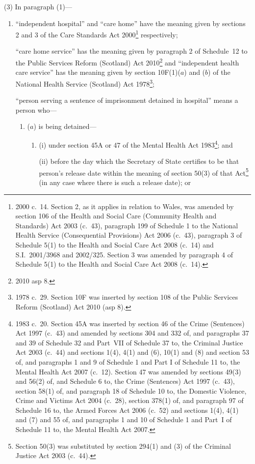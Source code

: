 \documentclass[12pt,a4paper]{article}
\begin{document}
(3) In paragraph (1)—
\begin{enumerate}\item[]
“independent hospital” and “care home” have the meaning given by sections 2 and 3 of the Care Standards Act 2000\footnote{2000 c.~14. Section 2, as it applies in relation to Wales, was amended by section 106 of the Health and Social Care (Community Health and Standards) Act 2003 (c.~43), paragraph 199 of Schedule 1 to the National Health Service (Consequential Provisions) Act 2006 (c.~43), paragraph 3 of Schedule 5(1) to the Health and Social Care Act 2008 (c.~14) and S.I.~2001/3968 and 2002/325. Section 3 was amended by paragraph 4 of Schedule 5(1) to the Health and Social Care Act 2008 (c.~14).} respectively;

“care home service” has the meaning given by paragraph 2 of Schedule~12 to the Public Services Reform (Scotland) Act 2010\footnote{2010 asp 8.} and “independent health care service” has the meaning given by section 10F(1)($a$)  and ($b$)  of the National Health Service (Scotland) Act 1978\footnote{1978 c.~29. Section 10F was inserted by section 108 of the Public Services Reform (Scotland) Act 2010 (asp 8).};

“person serving a sentence of imprisonment detained in hospital” means a person who—
\begin{enumerate}\item[]
($a$) 
is being detained—
\begin{enumerate}\item[]
(i) 
under section 45A or 47 of the Mental Health Act 1983\footnote{1983 c.~20. Section 45A was inserted by section 46 of the Crime (Sentences) Act 1997 (c.~43) and amended by sections 304 and 332 of, and paragraphs 37 and 39 of Schedule 32 and Part~VII of Schedule 37 to, the Criminal Justice Act 2003 (c.~44) and sections 1(4), 4(1) and (6), 10(1) and (8) and section 53 of, and paragraphs 1 and 9 of Schedule 1 and Part I of Schedule 11 to, the Mental Health Act 2007 (c.~12). Section 47 was amended by sections 49(3) and 56(2) of, and Schedule 6 to, the Crime (Sentences) Act 1997 (c.~43), section 58(1) of, and paragraph 18 of Schedule 10 to, the Domestic Violence, Crime and Victims Act 2004 (c.~28), section 378(1) of, and paragraph 97 of Schedule 16 to, the Armed Forces Act 2006 (c.~52) and sections 1(4), 4(1) and (7) and 55 of, and paragraphs 1 and 10 of Schedule 1 and Part~I of Schedule 11 to, the Mental Health Act 2007.}; and

(ii) 
before the day which the Secretary of State certifies to be that person’s release date within the meaning of section 50(3) of that Act\footnote{Section 50(3) was substituted by section 294(1) and (3) of the Criminal Justice Act 2003 (c.~44).} (in any case where there is such a release date); or
\end{enumerate}


\end{enumerate}
\end{enumerate}
\end{document}
